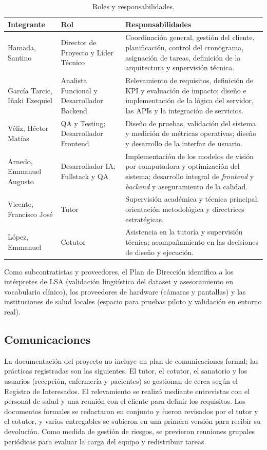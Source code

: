 \begin{table}[htbp]
\centering
\caption{Roles y responsabilidades.}\label{tab:roles}
\footnotesize
\begin{tabularx}{\textwidth}{@{}p{3.1cm}p{3.3cm}X@{}}
\toprule
\textbf{Integrante} & \textbf{Rol} & \textbf{Responsabilidades} \\
\midrule
Hamada, Santino & Director de Proyecto y Líder Técnico & Coordinación general, gestión del cliente, planificación, control del cronograma, asignación de tareas, definición de la arquitectura y supervisión técnica. \\
García Tarcic, Iñaki Ezequiel & Analista Funcional y Desarrollador Backend & Relevamiento de requisitos, definición de KPI y evaluación de impacto; diseño e implementación de la lógica del servidor, las APIs y la integración de servicios. \\
Véliz, Héctor Matías & QA y Testing; Desarrollador Frontend & Diseño de pruebas, validación del sistema y medición de métricas operativas; diseño y desarrollo de la interfaz de usuario. \\
Arnedo, Emmanuel Augusto & Desarrollador IA; Fullstack y QA & Implementación de los modelos de visión por computadora y optimización del sistema; desarrollo integral de \emph{frontend} y \emph{backend} y aseguramiento de la calidad. \\
Vicente, Francisco José & Tutor & Supervisión académica y técnica principal; orientación metodológica y directrices estratégicas. \\
López, Emmanuel & Cotutor & Asistencia en la tutoría y supervisión técnica; acompañamiento en las decisiones de diseño y ejecución. \\
\bottomrule
\end{tabularx}
\end{table}

Como subcontratistas y proveedores, el Plan de Dirección identifica a los intérpretes de LSA (validación lingüística del dataset y asesoramiento en vocabulario clínico), los proveedores de hardware (cámaras y pantallas) y las instituciones de salud locales (espacio para pruebas piloto y validación en entorno real).

\subsection{Comunicaciones}

La documentación del proyecto no incluye un plan de comunicaciones formal; las prácticas registradas son las siguientes. El tutor, el cotutor, el sanatorio y los usuarios (recepción, enfermería y pacientes) se gestionan de cerca según el Registro de Interesados. El relevamiento se realizó mediante entrevistas con el personal de salud y una reunión con el cliente para definir los requisitos. Los documentos formales se redactaron en conjunto y fueron revisados por el tutor y el cotutor, y varios entregables se subieron en una primera versión para recibir su devolución. Como medida de gestión de riesgos, se previeron reuniones grupales periódicas para evaluar la carga del equipo y redistribuir tareas.

